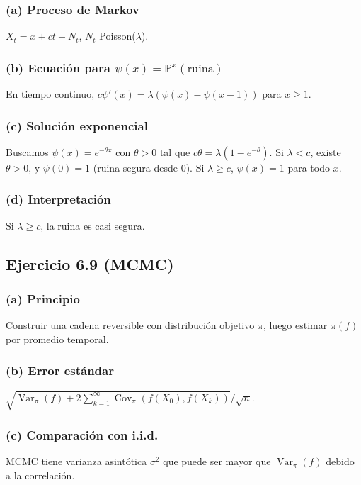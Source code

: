 \documentclass[letterpaper, 12pt]{article}
\renewcommand{\P}{\mathbb{P}}
\newcommand{\1}{\mathbbm{1}}
\DeclareMathOperator{\Var}{Var}
\DeclareMathOperator{\Cov}{Cov}
\begin{document}
    \subsubsection*{(a) Proceso de Markov}
    $X_t=x+ct-N_t$, $N_t$ Poisson($\lambda$).

    \subsubsection*{(b) Ecuaci\'on para $\psi(x)=\P^x(\text{ruina})$}
    En tiempo continuo, $c\psi'(x)=\lambda(\psi(x)-\psi(x-1))$ para $x\ge1$.

    \subsubsection*{(c) Soluci\'on exponencial}
    Buscamos $\psi(x)=e^{-\theta x}$ con $\theta>0$ tal que $c\theta=\lambda(1-e^{-\theta})$. Si $\lambda<c$, existe $\theta>0$, y $\psi(0)=1$ (ruina segura desde 0). Si $\lambda\ge c$, $\psi(x)=1$ para todo $x$.

    \subsubsection*{(d) Interpretaci\'on}
    Si $\lambda\ge c$, la ruina es casi segura.

    \subsection{Ejercicio 6.9 (MCMC)}

    \subsubsection*{(a) Principio}
    Construir una cadena reversible con distribuci\'on objetivo $\pi$, luego estimar $\pi(f)$ por promedio temporal.

    \subsubsection*{(b) Error est\'andar}
    $\sqrt{\Var_\pi(f)+2\sum_{k=1}^\infty\Cov_\pi(f(X_0),f(X_k))}/\sqrt{n}$.

    \subsubsection*{(c) Comparaci\'on con i.i.d.}
    MCMC tiene varianza asint\'otica $\sigma^2$ que puede ser mayor que $\Var_\pi(f)$ debido a la correlaci\'on.
\end{document}
